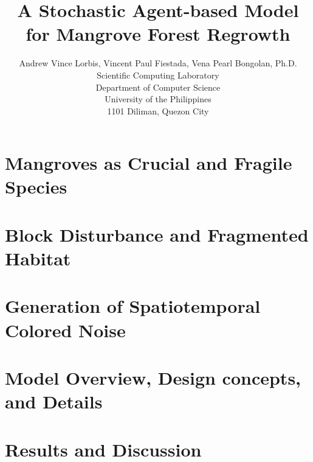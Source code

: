 \documentclass[a4paper]{scl-article}
\begin{document}
\title{A Stochastic Agent-based Model for Mangrove Forest Regrowth}

\author{Andrew Vince Lorbis, Vincent Paul Fiestada, Vena Pearl Bongolan, Ph.D.\\
Scientific Computing Laboratory\\
Department of Computer Science\\
University of the Philippines\\
1101 Diliman, Quezon City
}

\maketitle

\begin{abstract}
    
\end{abstract}

\begin{multicols}{2}

\section{Mangroves as Crucial and Fragile Species}

\section{Block Disturbance and Fragmented Habitat}

\section{Generation of Spatiotemporal Colored Noise}

\section{Model Overview, Design concepts, and Details}

\section{Results and Discussion}

\end{multicols}

\label{sect:bib}


\end{document}
